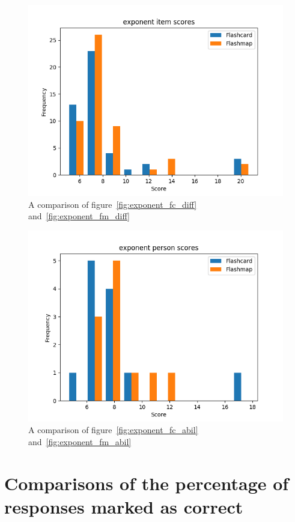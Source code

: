 \begin{figure}
    \includegraphics[width=\textwidth]{img/exponent_diff.png}
    \caption{A comparison of figure~\protect\ref{fig:exponent_fc_diff} and~\protect\ref{fig:exponent_fm_diff}}
    \label{fig:exponent_diff}
\end{figure}
\begin{figure}
    \includegraphics[width=\textwidth]{img/exponent_abil.png}
    \caption{A comparison of figure~\protect\ref{fig:exponent_fc_abil} and~\protect\ref{fig:exponent_fm_abil}}
    \label{fig:exponent_abil}
\end{figure}

\FloatBarrier
\section{Comparisons of the percentage of responses marked as correct}

